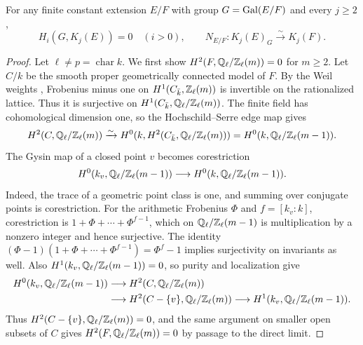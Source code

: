 \begin{lemma}\label{lem:paper-global-constant-norm}
For any finite constant extension $E/F$ with group $G=\operatorname{Gal}(E/F)$ and every $j\ge2$,
\[
 H_i(G,K_j(E))=0\quad(i>0),\qquad
 N_{E/F}:K_j(E)_G\xrightarrow{\sim}K_j(F).
\]
\end{lemma}
\begin{proof}
Let $\ell\ne p=\operatorname{char}k$.
We first show $H^2(F,\mathbb Q_\ell/\mathbb Z_\ell(m))=0$ for $m\ge2$.
Let $C/k$ be the smooth proper geometrically connected model of $F$.
By the Weil weights \cite{Deligne1974}, Frobenius minus one on $H^1(C_{\bar k},\mathbb Z_\ell(m))$ is invertible on the rationalized lattice.
Thus it is surjective on $H^1(C_{\bar k},\mathbb Q_\ell/\mathbb Z_\ell(m))$.
The finite field has cohomological dimension one, so the Hochschild--Serre edge map gives
\[
 H^2(C,\mathbb Q_\ell/\mathbb Z_\ell(m))\xrightarrow{\sim}H^0(k,H^2(C_{\bar k},\mathbb Q_\ell/\mathbb Z_\ell(m)))
 =H^0(k,\mathbb Q_\ell/\mathbb Z_\ell(m-1)).
\]
The Gysin map of a closed point $v$ becomes corestriction
\[
 H^0(k_v,\mathbb Q_\ell/\mathbb Z_\ell(m-1))\longrightarrow H^0(k,\mathbb Q_\ell/\mathbb Z_\ell(m-1)).
\]
Indeed, the trace of a geometric point class is one, and summing over conjugate points is corestriction.
For the arithmetic Frobenius $\Phi$ and $f=[k_v:k]$, corestriction is $1+\Phi+\cdots+\Phi^{f-1}$, which on $\mathbb Q_\ell/\mathbb Z_\ell(m-1)$ is multiplication by a nonzero integer and hence surjective.
The identity $(\Phi-1)(1+\Phi+\cdots+\Phi^{f-1})=\Phi^f-1$ implies surjectivity on invariants as well.
Also $H^1(k_v,\mathbb Q_\ell/\mathbb Z_\ell(m-1))=0$, so purity and localization give
\[
\begin{aligned}
 H^0(k_v,\mathbb Q_\ell/\mathbb Z_\ell(m-1))&\longrightarrow H^2(C,\mathbb Q_\ell/\mathbb Z_\ell(m))\\
 &\longrightarrow H^2(C-\{v\},\mathbb Q_\ell/\mathbb Z_\ell(m))\longrightarrow H^1(k_v,\mathbb Q_\ell/\mathbb Z_\ell(m-1)).
\end{aligned}
\]
Thus $H^2(C-\{v\},\mathbb Q_\ell/\mathbb Z_\ell(m))=0$, and the same argument on smaller open subsets of $C$ gives $H^2(F,\mathbb Q_\ell/\mathbb Z_\ell(m))=0$ by passage to the direct limit.


\end{proof}
